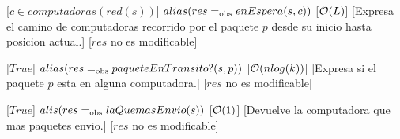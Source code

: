 \begin{Interfaz}
  
  [$ c \in computadoras(red(s)) $]  
  {$alias(res =_{\mathrm{obs}} enEspera(s, c))$}
  [$\mathcal{O}(L)$]
  [Expresa el camino de computadoras recorrido por el paquete $p$ desde su inicio hasta posicion actual.]
	[$res$ no es modificable]
	
	\newpage
  [$ True $]  
  {$alias(res =_{\mathrm{obs}} paqueteEnTransito?(s, p))$}
  [$\mathcal{O}(nlog(k))$]
  [Expresa si el paquete $p$ esta en alguna computadora.]
  [$res$ no es modificable]
  
  [$ True $]
  {$alis(res =_{\mathrm{obs}} laQuemasEnvio(s))$}
  [$\mathcal{O}(1)$]
  [Devuelve la computadora que mas paquetes envio.]
  [$res$ no es modificable]

\end{Interfaz}

